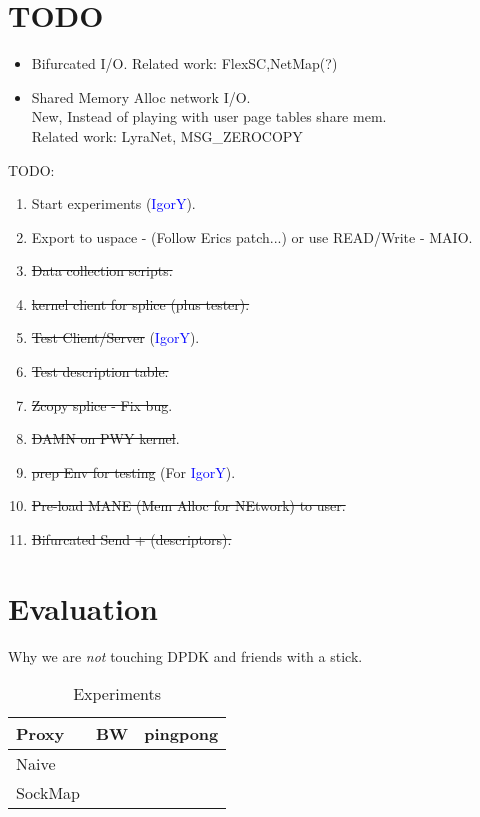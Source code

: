 \documentclass[newfonts=false,format=sigconf,9pt,letterpaper]{acmart}
\newcommand{\oursys}{MAIO\xspace}
\newcommand{\igor}{\textcolor{blue}{IgorY}\xspace}
\begin{document}
\maketitle
\sloppypar

\section{TODO}
\begin{itemize}
    \item Bifurcated I/O. Related work: FlexSC,NetMap(?)
    \item Shared Memory Alloc network I/O.\\ New, Instead of playing with user page tables share mem.\\ Related work: LyraNet, MSG\_ZEROCOPY\cite{desendmsg}
\end{itemize}
\smallskip
TODO:
\begin{enumerate}
    \item Start experiments (\igor).
    \item Export to uspace - (Follow Erics patch...) or use READ/Write - \oursys.
    \item \st{Data collection scripts.}
    \item \st{kernel client for splice (plus tester).}
    \item \st{Test Client/Server }(\igor).
    \item \st{Test description table.}
    \item \st{Zcopy splice - Fix bug}.
    \item \st{DAMN on PWY kernel}.
    \item \st{prep Env for testing }(For \igor).
    \item \st{Pre-load MANE (Mem Alloc for NEtwork) to user.} 
    \item \st{Bifurcated Send + (descriptors).}
\end{enumerate}





\section{Evaluation}
Why we are \emph{not} touching DPDK and friends with a stick.
\begin{table}[h]
\centering
\begin{tabular}{l|l|l}
Proxy & BW & pingpong \\\hline
Naive & &\\
SockMap & &\\
\hline
\end{tabular}
\caption{\label{tab:contributions}Experiments}
\end{table}
\end{document}
